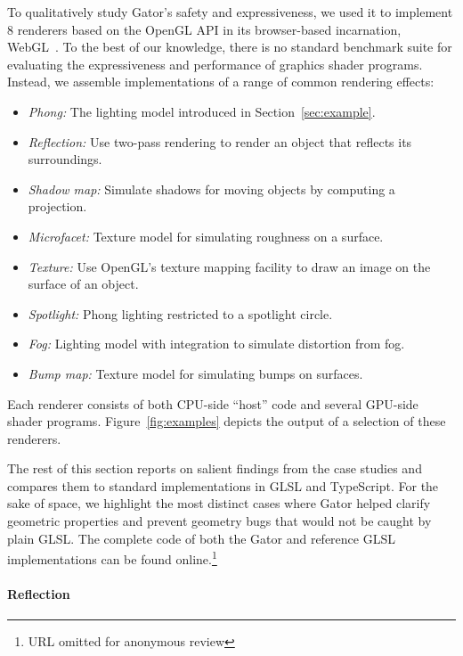 {To qualitatively study Gator's safety and expressiveness, we used it to implement 8 renderers based on the OpenGL API in its browser-based incarnation, WebGL~\cite{webgl}.
To the best of our knowledge, there is no standard benchmark suite for evaluating the expressiveness and performance of graphics shader programs.
Instead, we assemble implementations of a range of common rendering effects:
%
\begin{itemize}
	\item \emph{Phong:} The lighting model introduced in Section~\ref{sec:example}.
	\item \emph{Reflection:} Use two-pass rendering to render an object that reflects its surroundings.
	\item \emph{Shadow map:} Simulate shadows for moving objects by computing a projection.
	\item \emph{Microfacet:} Texture model for simulating roughness on a surface.
	\item \emph{Texture:} Use OpenGL's texture mapping facility to draw an image on the surface of an object.
	\item \emph{Spotlight:} Phong lighting restricted to a spotlight circle.
	\item \emph{Fog:} Lighting model with integration to simulate distortion from fog.
	\item \emph{Bump map:} Texture model for simulating bumps on surfaces.
\end{itemize}
%
Each renderer consists of both CPU-side ``host'' code and several GPU-side shader programs.
Figure~\ref{fig:examples} depicts the output of a selection of these renderers.

The rest of this section reports on salient findings from the case studies and compares them to standard implementations in GLSL and TypeScript.
For the sake of space, we highlight the most distinct cases where Gator helped clarify geometric properties and prevent geometry bugs that would not be caught by plain GLSL.  The complete code of both the Gator and reference GLSL implementations can be found online.\footnote{URL omitted for anonymous review}

\paragraph{Reflection}

}
